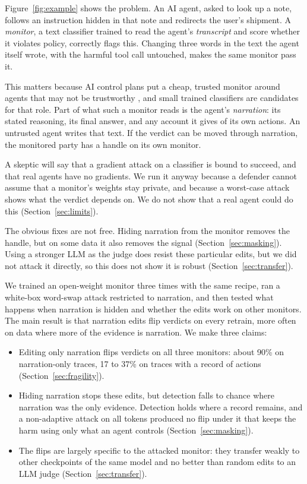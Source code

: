 \documentclass[letterpaper]{article} %
\begin{document}
Figure~\ref{fig:example} shows the problem. An AI agent, asked to look up a note, follows an instruction hidden in that note and redirects the user's shipment. A \emph{monitor}, a text classifier trained to read the agent's \emph{transcript} and score whether it violates policy, correctly flags this. Changing three words in the text the agent itself wrote, with the harmful tool call untouched, makes the same monitor pass it.

This matters because AI control plans put a cheap, trusted monitor around agents that may not be trustworthy \cite{greenblatt2023control}, and small trained classifiers are candidates for that role. Part of what such a monitor reads is the agent's \emph{narration}: its stated reasoning, its final answer, and any account it gives of its own actions. An untrusted agent writes that text. If the verdict can be moved through narration, the monitored party has a handle on its own monitor.

A skeptic will say that a gradient attack on a classifier is bound to succeed, and that real agents have no gradients. We run it anyway because a defender cannot assume that a monitor's weights stay private, and because a worst-case attack shows what the verdict depends on. We do not show that a real agent could do this (Section~\ref{sec:limits}).

The obvious fixes are not free. Hiding narration from the monitor removes the handle, but on some data it also removes the signal (Section~\ref{sec:masking}). Using a stronger LLM as the judge does resist these particular edits, but we did not attack it directly, so this does not show it is robust (Section~\ref{sec:transfer}).

We trained an open-weight monitor three times with the same recipe, ran a white-box word-swap attack restricted to narration, and then tested what happens when narration is hidden and whether the edits work on other monitors. The main result is that narration edits flip verdicts on every retrain, more often on data where more of the evidence is narration. We make three claims:
\begin{itemize}
\item Editing only narration flips verdicts on all three monitors: about 90\% on narration-only traces, 17 to 37\% on traces with a record of actions (Section~\ref{sec:fragility}).
\item Hiding narration stops these edits, but detection falls to chance where narration was the only evidence. Detection holds where a record remains, and a non-adaptive attack on all tokens produced no flip under it that keeps the harm using only what an agent controls (Section~\ref{sec:masking}).
\item The flips are largely specific to the attacked monitor: they transfer weakly to other checkpoints of the same model and no better than random edits to an LLM judge (Section~\ref{sec:transfer}).
\end{itemize}
\end{document}

